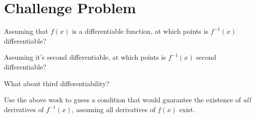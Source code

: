 \documentclass[12pt]{article}
\begin{document}
\section{Challenge Problem}

Assuming that $f(x)$ is a differentiable function, at which points is $f^{-1}(x)$ differentiable?

Assuming it's second differentiable, at which points is $f^{-1}(x)$ second differentiable?

What about third differentiability?

Use the above work to guess a condition that would guarantee the existence of \textit{all} derivatives of $f^{-1}(x)$, assuming all derivatives of $f(x)$ exist.


\end{document}
